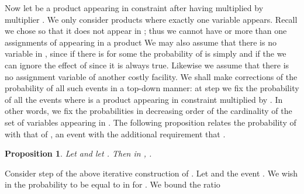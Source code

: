 \documentclass[11pt]{article}
\newtheorem{proposition}{Proposition}[section]
\newcommand{\qed}{\hfill \mbox{\raggedright \rule{2mm}{3mm}}}
\newenvironment{proof}{\noindent{\bf Proof.}}{\qed}
\begin{document}
Now let   be a product  appearing in constraint   after having
multiplied by multiplier .  We only consider products where exactly
one variable   appears. Recall we chose    so that it
does not appear in ; thus  
we  cannot have   or  more  than one
assignments  of  appearing  in a  product 
  We  may also  assume  that there  is no  
variable in , since if  there is for some  the
probability of  is simply  and if  the we can ignore
the effect of  since it is always true. Likewise we assume that
there is no assignment variable  of another costly facility. We shall
make corrections of the probability of all such events  in a
top-down manner: at step  we  fix the probability of all the events
     where     is a product 
appearing in constraint  multiplied by . In other words, we fix
the probabilities  in decreasing order  of the cardinality of  the set
of variables appearing in .  The following proposition relates the
probability       of            with       that      of
, an event with the additional
requirement that  .

\vspace*{-0.1cm}
\begin{proposition}\label{level-ratio}
Let  and let . Then
in , .
\end{proposition}
\vspace*{-0.1cm}

\begin{comment}
\begin{proof}
Since the considered distribution is assignment-symmetric, event  is equivalent  to the event 
of randomly distributing  balls to the slots of  bins, with at most one ball in each slot, each bin having  identical slots, asking that ball  is tossed in the bin of  and ball  is tossed in bin . Since there are  slots in each bin and the balls are at most , it is easy to see
that .
\end{proof}
\end{comment}

\iffalse---------- expanded version 
\begin{sloppypar}
Consider step  of the above iterative construction of . Let
 and the event
. We wish in  the probability
 to be equal to
 in  for . We bound the ratio 
\end{sloppypar}
----------- end expanded version \fi 
\begin{sloppypar}
Consider step  of the above iterative construction of . Let
 and the event
. We wish in  the probability
 to be equal to
 in  for . We bound the ratio 
\end{sloppypar}
\end{document}
